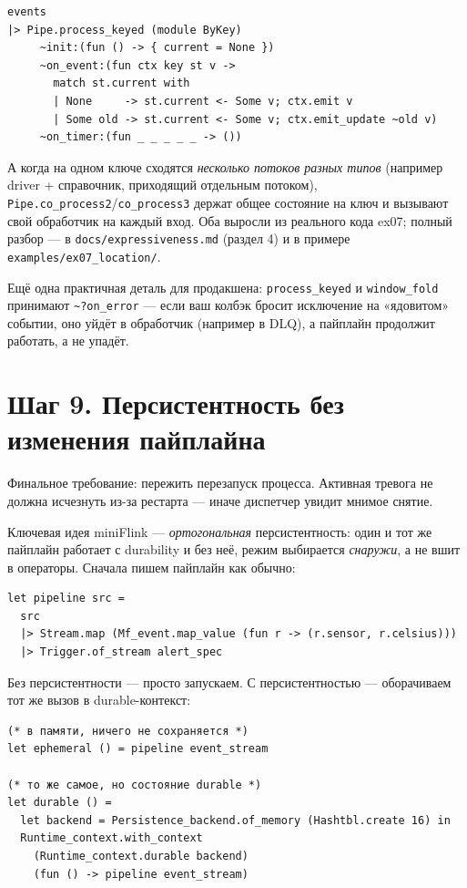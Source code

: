 \documentclass[11pt,a4paper]{article}
\begin{document}
\begin{lstlisting}
events
|> Pipe.process_keyed (module ByKey)
     ~init:(fun () -> { current = None })
     ~on_event:(fun ctx key st v ->
       match st.current with
       | None     -> st.current <- Some v; ctx.emit v
       | Some old -> st.current <- Some v; ctx.emit_update ~old v)
     ~on_timer:(fun _ _ _ _ _ -> ())
\end{lstlisting}

А когда на одном ключе сходятся \emph{несколько потоков разных типов}
(например driver + справочник, приходящий отдельным потоком),
\texttt{Pipe.co\_process2}/\texttt{co\_process3} держат общее состояние
на ключ и вызывают свой обработчик на каждый вход. Оба выросли из
реального кода ex07; полный разбор --- в \texttt{docs/expressiveness.md}
(раздел 4) и в примере \texttt{examples/ex07\_location/}.

Ещё одна практичная деталь для продакшена: \texttt{process\_keyed} и
\texttt{window\_fold} принимают \texttt{\textasciitilde{}?on\_error} ---
если ваш колбэк бросит исключение на «ядовитом» событии, оно уйдёт в
обработчик (например в DLQ), а пайплайн продолжит работать, а не упадёт.

\section{Шаг 9. Персистентность без изменения пайплайна}

Финальное требование: пережить перезапуск процесса. Активная тревога
не должна исчезнуть из-за рестарта --- иначе диспетчер увидит мнимое
снятие.

Ключевая идея miniFlink --- \emph{ортогональная} персистентность: один
и тот же пайплайн работает с durability и без неё, режим выбирается
\emph{снаружи}, а не вшит в операторы. Сначала пишем пайплайн как
обычно:

\begin{lstlisting}
let pipeline src =
  src
  |> Stream.map (Mf_event.map_value (fun r -> (r.sensor, r.celsius)))
  |> Trigger.of_stream alert_spec
\end{lstlisting}

Без персистентности --- просто запускаем. С персистентностью ---
оборачиваем тот же вызов в durable-контекст:

\begin{lstlisting}
(* в памяти, ничего не сохраняется *)
let ephemeral () = pipeline event_stream

(* то же самое, но состояние durable *)
let durable () =
  let backend = Persistence_backend.of_memory (Hashtbl.create 16) in
  Runtime_context.with_context
    (Runtime_context.durable backend)
    (fun () -> pipeline event_stream)
\end{lstlisting}
\end{document}
